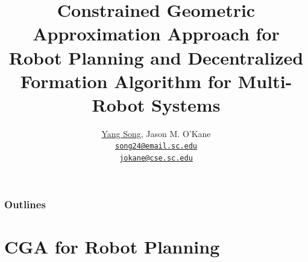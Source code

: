 \documentclass[10pt]{beamer}
\title{Constrained Geometric Approximation Approach for Robot Planning and
  Decentralized Formation Algorithm for Multi-Robot Systems}
\author{
  \underline{Yang Song}, Jason M. O'Kane\\
  \href{mailto:song24@email.sc.edu}{{\tt song24@email.sc.edu} \\
  \href{mailto:jokane@cse.sc.edu}{\tt jokane@cse.sc.edu}}
}
\institute[
  Dept.\ of Computer Science and Engineering\\
  University of South Carolina
] %
{%
  Dept. of Computer Science and Engineering\\
  University of South Carolina
  
}
\begin{document}
\begin{frame}[plain] %
  \titlepage
\end{frame}
\begin{frame}
  \frametitle{Outlines}
  \tableofcontents[]
\end{frame}
\section{CGA for Robot Planning}
\end{document}
